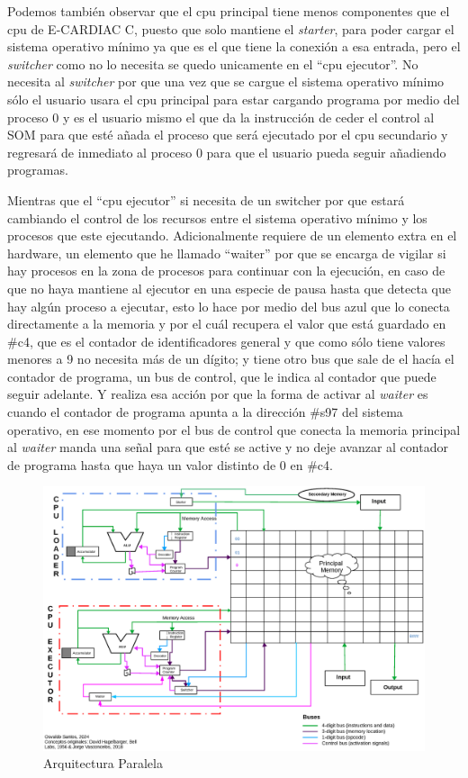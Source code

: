 \documentclass[letterpaper,12pt,oneside]{book}
\begin{document}
		Podemos también observar que el cpu principal tiene menos componentes que el cpu de E-CARDIAC C, puesto que solo mantiene el \textit{starter}, para
		poder cargar el sistema operativo mínimo ya que es el que tiene la conexión a esa entrada, pero el \textit{switcher} como no lo necesita se quedo
		unicamente en el ``cpu ejecutor''. No necesita al \textit{switcher} por que una vez que se cargue el sistema operativo mínimo sólo el usuario usara
		el cpu principal para estar cargando programa por medio del proceso 0 y es el usuario mismo el que da la instrucción de ceder el control
		al SOM para que esté añada el proceso que será ejecutado por el cpu secundario y regresará de inmediato al proceso 0 para que el usuario
		pueda seguir añadiendo programas.
		
		Mientras que el ``cpu ejecutor'' si necesita de un switcher por que estará cambiando el control de los recursos entre el sistema operativo mínimo
		y los procesos que este ejecutando. Adicionalmente requiere de un elemento extra en el hardware, un elemento que he llamado ``waiter'' por que se encarga
		de vigilar si hay procesos en la zona de procesos para continuar con la ejecución, en caso de que no haya mantiene al ejecutor en una especie de
		pausa hasta que detecta que hay algún proceso a ejecutar, esto lo hace por medio del bus azul que lo conecta directamente a la memoria
		y por el cuál recupera el valor que está guardado en \#c4, que es el contador de identificadores general y que como sólo tiene valores menores a 9
		no necesita más de un dígito; y tiene otro bus que sale de el hacía el contador de programa, un bus de control, que le indica al contador
		que puede seguir adelante. Y realiza esa acción por que la forma de activar al \textit{waiter} es cuando el contador de programa
		apunta a la dirección \#s97 del sistema operativo, en ese momento por el bus de control que conecta la memoria principal al
		\textit{waiter} manda una señal para que esté se active y no deje avanzar al contador de programa hasta que haya un valor distinto de 0
		en \#c4.
	 	
	 	\begin{figure}[h]		
			\centering
			\includegraphics[scale=0.63, angle=90]{media/Paralela/Arquitectura_diagrama_Paralelo.eps}
			\caption{ Arquitectura Paralela }
			\label{fig:diag_arq_parallel}
		\end{figure}
		
\end{document}
